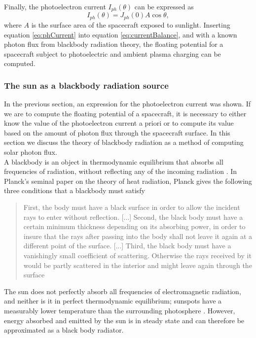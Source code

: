 Finally, the photoelectron current $I_{ph}(\theta)$ can be expressed as 
\begin{equation}\label{eq:phCurrent}
    I_{ph}(\theta) = J_{ph}(0) A \cos \theta,
\end{equation}
where $A$ is the surface area of the spacecraft exposed to sunlight. Inserting equation \eqref{eq:phCurrent} into equation \eqref{eq:currentBalance}, and with a known photon flux from blackbody radiation theory, the floating potential for a spacecraft subject to photoelectric and ambient plasma charging can be computed.

\subsubsection*{The sun as a blackbody radiation source}
In the previous section, an expression for the photoelectron current was shown. If we are to compute the floating potential of a spacecraft, it is necessary to either know the value of the photoelectron current a priori or to compute its value based on the amount of photon flux through the spacecraft surface. In this section we discuss the theory of blackbody radiation as a method of computing solar photon flux.
\\
A blackbody is an object in thermodynamic equilibrium that absorbs all frequencies of radiation, without reflecting any of the incoming radiation \parencite{Planck}. In Planck's seminal paper on the theory of heat radiation, Planck gives the following three conditions that a blackbody must satisfy \parencite{Planck}

\begin{quote}
    First, the body must have a black surface in order to allow the incident rays to enter without reflection. [...] Second, the black body must have a certain minimum thickness depending on its absorbing power, in order to insure that the rays after passing into the body shall not leave it again at a different point of the surface. [...] Third, the black body must have a vanishingly small coefficient of scattering. Otherwise the rays received by it would be partly scattered in the interior and might leave again through the surface
\end{quote}

The sun does not perfectly absorb all frequencies of electromagnetic radiation, and neither is it in perfect thermodynamic equilibrium; sunspots have a measurably lower temperature than the surrounding photosphere \parencite{Solanki2003}. However, energy absorbed and emitted by the sun is in steady state and can therefore be approximated as a black body radiator. 

